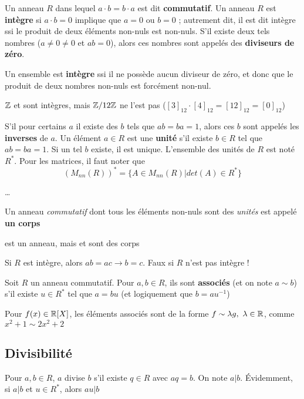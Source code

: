 \documentclass[12pt,a4paper]{article}
\begin{document}
Un anneau $R$ dans lequel $a\cdot b = b \cdot a$ est dit \textbf{commutatif}. Un anneau $R$ est \textbf{intègre} si $a\cdot b = 0$ implique que $a=0$ ou $b=0$ ; autrement dit, il est dit intègre ssi le produit de deux éléments non-nuls est non-nuls. S'il existe deux tels nombres ($a \neq 0 \neq 0$ et $ab = 0$), alors ces nombres sont appelés des \textbf{diviseurs de zéro}. \begin{boite}
    Un ensemble est \textbf{intègre} ssi il ne possède aucun diviseur de zéro, et donc que le produit de deux nombres non-nuls est forcément non-nul.
\end{boite}
\begin{exemple}
    $\mathbb{Z}$ et \R sont intègres, mais $\mathbb{Z}/12\mathbb{Z}$ ne l'est pas \big($[3]_{12}\cdot [4]_{12} = [12]_{12} = [0]_{12}$\big)
\end{exemple}
\begin{center}
\end{center}
S'il pour certains $a$ il existe des $b$ tels que $ab = ba = 1$, alors ces $b$ sont appelés les \textbf{inverses} de $a$. Un élément $a \in R$ est une \textbf{unité} s'il existe $b \in R$ tel que $ab = ba = 1$. Si un tel $b$ existe, il est unique. L'ensemble des unités de $R$ est noté $R^*$. Pour les matrices, il faut noter que 
\[(M_{nn}(R))^* = \{A \in M_{nn}(R) | det(A) \in R^*\}\]

\dots

Un anneau \textit{commutatif} dont tous les éléments non-nuls sont des \textit{unités} est appelé \textbf{un corps}
\begin{exemple}
    \Z est un anneau, mais \Q et \R sont des corps
\end{exemple}
Si $R$ est intègre, alors $ab = ac \to b = c$. Faux si $R$ n'est pas intègre !

\begin{boite}
     Soit $R$ un anneau commutatif. Pour $a,b \in R$, ils sont \textbf{associés} (et on note $a \sim b$) s'il existe $u \in R^*$ tel que $a = bu$ (et logiquement que $b = au^{-1}$)
\end{boite}
\begin{exemple}
    Pour $f(x) \in \mathbb{R}[X]$, les éléments associés sont de la forme $f \sim \lambda g,\ \lambda \in \R$, comme $x^2 + 1 \sim 2x^2 + 2$
\end{exemple}

\subsection{Divisibilité}
Pour $a,b \in R$, $a$ divise $b$ s'il existe $q \in R$ avec $aq = b$. On note $a | b$. Évidemment, si $a|b$ et $u \in R^*$, alors $au|b$
\end{document}
